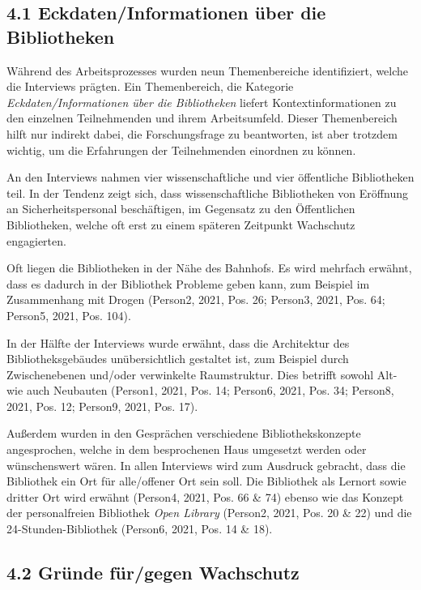 \documentclass[a4paper,
fontsize=11pt,
oneside,
numbers=noperiodatend,
parskip=half-,
bibliography=totoc,
final
]{scrartcl}
\begin{document}
\hypertarget{eckdateninformationen-uxfcber-die-bibliotheken}{%
\subsection{4.1 Eckdaten/Informationen über die
Bibliotheken}\label{eckdateninformationen-uxfcber-die-bibliotheken}}

Während des Arbeitsprozesses wurden neun Themenbereiche identifiziert,
welche die Interviews prägten. Ein Themenbereich, die Kategorie
\emph{Eckdaten/Informationen über die Bibliotheken} liefert
Kontextinformationen zu den einzelnen Teilnehmenden und ihrem
Arbeitsumfeld. Dieser Themenbereich hilft nur indirekt dabei, die
Forschungsfrage zu beantworten, ist aber trotzdem wichtig, um die
Erfahrungen der Teilnehmenden einordnen zu können.

An den Interviews nahmen vier wissenschaftliche und vier öffentliche
Bibliotheken teil. In der Tendenz zeigt sich, dass wissenschaftliche
Bibliotheken von Eröffnung an Sicherheitspersonal beschäftigen, im
Gegensatz zu den Öffentlichen Bibliotheken, welche oft erst zu einem
späteren Zeitpunkt Wachschutz engagierten.

Oft liegen die Bibliotheken in der Nähe des Bahnhofs. Es wird mehrfach
erwähnt, dass es dadurch in der Bibliothek Probleme geben kann, zum
Beispiel im Zusammenhang mit Drogen (Person2, 2021, Pos. 26; Person3,
2021, Pos. 64; Person5, 2021, Pos. 104).

In der Hälfte der Interviews wurde erwähnt, dass die Architektur des
Bibliotheksgebäudes unübersichtlich gestaltet ist, zum Beispiel durch
Zwischenebenen und/oder verwinkelte Raumstruktur. Dies betrifft sowohl
Alt- wie auch Neubauten (Person1, 2021, Pos. 14; Person6, 2021, Pos. 34;
Person8, 2021, Pos. 12; Person9, 2021, Pos. 17).

Außerdem wurden in den Gesprächen verschiedene Bibliothekskonzepte
angesprochen, welche in dem besprochenen Haus umgesetzt werden oder
wünschenswert wären. In allen Interviews wird zum Ausdruck gebracht,
dass die Bibliothek ein Ort für alle/offener Ort sein soll. Die
Bibliothek als Lernort sowie dritter Ort wird erwähnt (Person4, 2021,
Pos. 66 \& 74) ebenso wie das Konzept der personalfreien Bibliothek
\emph{Open Library} (Person2, 2021, Pos. 20 \& 22) und die
24-Stunden-Bibliothek (Person6, 2021, Pos. 14 \& 18).

\hypertarget{gruxfcnde-fuxfcrgegen-wachschutz}{%
\subsection{4.2 Gründe für/gegen
Wachschutz}\label{gruxfcnde-fuxfcrgegen-wachschutz}}
\end{document}
